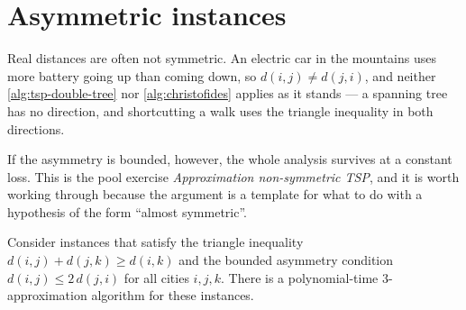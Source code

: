 \section{Asymmetric instances}
\label{sec:asymmetric-tsp}

Real distances are often not symmetric. An electric car in the mountains uses
more battery going up than coming down, so $d(i,j) \ne d(j,i)$, and neither
\cref{alg:tsp-double-tree} nor \cref{alg:christofides} applies as it stands ---
a spanning tree has no direction, and shortcutting a walk uses the triangle
inequality in both directions.

If the asymmetry is bounded, however, the whole analysis survives at a constant
loss. This is the pool exercise \emph{Approximation non-symmetric TSP}, and it
is worth working through because the
argument is a template for what to do with a hypothesis of the form ``almost
symmetric''.

\begin{theorem}\label{thm:asymmetric-tsp}
Consider  instances that satisfy the triangle inequality
$d(i,j) + d(j,k) \ge d(i,k)$ and the bounded asymmetry condition
$d(i,j) \le 2\,d(j,i)$ for all cities $i,j,k$. There is a polynomial-time
$3$-approximation algorithm for these instances.
\end{theorem}

